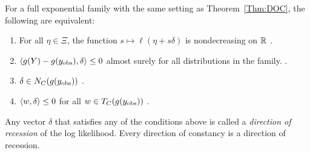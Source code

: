 \begin{theorem} \label{Thm:DOR}
For a full exponential family with the same setting as Theorem~\ref{Thm:DOC},
the following are equivalent:
\begin{enumerate}
\item For all $\eta \in \Xi$, the function $s \mapsto \ell( \eta + s\delta)$ is 
nondecreasing on ${\mathbb R}$ \cite[Theorem 3(b)]{Geyer:gdor}.
\item $\langle g(Y) - g(y_{\text{obs}}),\delta \rangle \leq 0$ almost surely for all distributions in 
the family. \cite[Theorem 3(d)]{Geyer:gdor}.
\item $\delta \in N_C(g(y_{\text{obs}}))$ \cite[Theorem 3(e)]{Geyer:gdor}.
\item $\langle w,\delta \rangle \leq 0$ for all $w \in T_C(g(y_{\text{obs}}))$ \cite[Theorem 3(f)]
{Geyer:gdor}.
\end{enumerate}
\end{theorem}
Any vector $\delta$ that satisfies any of the conditions above is called a 
\emph{direction of recession} of the log likelihood.  Every direction of constancy
is a direction of recession.

